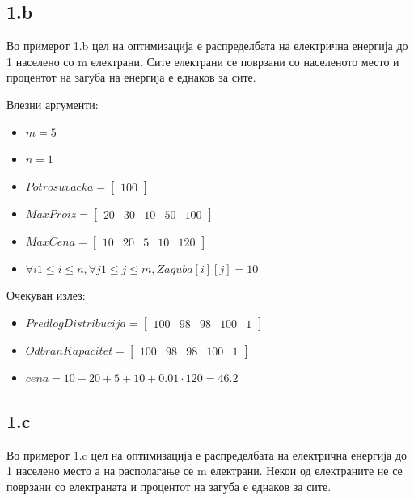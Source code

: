 \documentclass{article}
\begin{document}
\subsection{1.b}
Во примерот 1.b цел на оптимизација е распределбата на електрична енергија до 1 населено со m електрани. Сите електрани се поврзани со населеното место и процентот на загуба на енергија е еднаков за сите.

Влезни аргументи: 
\begin{itemize}
\item $m = 5$
\item $n = 1$
\item $Potrosuvacka = \begin{bmatrix} 100 \end{bmatrix}$
\item $MaxProiz = \begin{bmatrix} 20 & 30 & 10 & 50 & 100\end{bmatrix}$
\item $MaxCena = \begin{bmatrix} 10 & 20 & 5 & 10 & 120\end{bmatrix}$
\item $\forall i 1 \leq i \leq n, \forall j 1 \leq j \leq m, Zaguba[i][j] = 10$

\end{itemize}

Очекуван излез:
\begin{itemize}
\item $PredlogDistribucija = \begin{bmatrix} 100 & 98 & 98 & 100 & 1 \end{bmatrix}$
\item $OdbranKapacitet = \begin{bmatrix} 100 & 98 & 98 & 100 & 1\end{bmatrix}$
\item $cena = 10 + 20 + 5 + 10 + 0.01 \cdot 120 = 46.2 $
\end{itemize}

\subsection{1.c}

Во примерот 1.c цел на оптимизација е распределбата на електрична енергија до 1 населено место а на располагање се m електрани. Некои од електраните не се поврзани со електраната и процентот на загуба е еднаков за сите.
\end{document}
